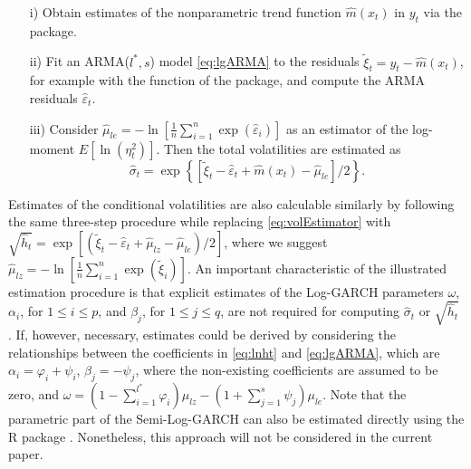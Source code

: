 \begin{enumerate}
	\item[\enspace\enspace i)] Obtain estimates of the nonparametric trend function $\hat{m}\left(x_t\right)$ in $y_t$ via the  package.
	\item[\enspace ii)] Fit an ARMA($l^{*}, s$) model \eqref{eq:lgARMA} to the residuals $\tilde{\xi}_t=y_t-\hat{m}\left(x_t\right)$, for example with the  function of the  package, and compute the ARMA residuals $\hat{\varepsilon}_t$.
	\item[iii)] Consider $\hat{\mu}_{le} = -\ln\left[\frac{1}{n}\sum_{i=1}^{n}\exp\left(\hat{\varepsilon}_i\right)\right]$ as an estimator of the log-moment $E\left[\ln\left(\eta_t^2\right)\right]$. Then the total volatilities are estimated as 
	\begin{equation} \label{eq:volEstimator}
	  \hat{\sigma}_t=\exp\left\{ \left[\tilde{\xi}_t - \hat{\varepsilon}_t + \hat{m}\left(x_t\right) - \hat{\mu}_{le}\right] / 2 \right\}.
	 \end{equation}
\end{enumerate}
Estimates of the conditional volatilities are also calculable similarly by following the same three-step procedure while replacing \eqref{eq:volEstimator} with $\sqrt{\hat{h}_t}=\exp\left[\left( \tilde{\xi}_t - \hat{\varepsilon}_t + \hat{\mu}_{lz} - \hat{\mu}_{le} \right)/2\right]$, where we suggest $\hat{\mu}_{lz}=-\ln\left[\frac{1}{n}\sum_{i=1}^{n}\exp\left(\tilde{\xi}_i\right)\right]$. 
An important characteristic of the illustrated estimation procedure is that explicit estimates of the Log-GARCH parameters $\omega$, $\alpha_i$, for $1 \leq i \leq p$, and $\beta_j$, for $1 \leq j \leq q$, are not required for computing $\hat{\sigma}_t$ or $\sqrt{\hat{h}_t}$ \citep{sucarrat2019log}. If, however, necessary, estimates could be derived by considering the relationships between the coefficients in \eqref{eq:lnht} and \eqref{eq:lgARMA}, which are $\alpha_i = \varphi_{i} + \psi_{i}$, $\beta_{j} = -\psi_{j}$, where the non-existing coefficients are assumed to be zero, and $\omega=\left(1-\sum_{i=1}^{l^{*}}\varphi_{i}\right)\mu_{lz}-\left(1+\sum_{j=1}^{s}\psi_{j}\right)\mu_{le}$.  
Note that the parametric part of the Semi-Log-GARCH can also be estimated directly using the R package  \citep{sucarrat2015lgarch}. Nonetheless, this approach will not be considered in the current paper.   

